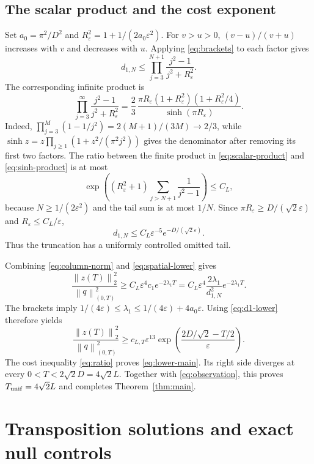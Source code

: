 \documentclass[11pt]{article}
\numberwithin{equation}{section}
\newcommand{\eps}{\varepsilon}
\newcommand{\norm}[1]{\left\|#1\right\|}
\begin{document}
\subsection{The scalar product and the cost exponent}

Set $a_0=\pi^2/D^2$ and $R_\eps^2=1+1/(2a_0\eps^2)$.
For $v>u>0$, $(v-u)/(v+u)$ increases with $v$ and decreases with $u$.
Applying \eqref{eq:brackets} to each factor gives
\begin{equation}\label{eq:scalar-product}
 d_{1,N}\le\prod_{j=3}^{N+1}\frac{j^2-1}{j^2+R_\eps^2}.
\end{equation}
The corresponding infinite product is
\begin{equation}\label{eq:sinh-product}
 \prod_{j=3}^\infty\frac{j^2-1}{j^2+R_\eps^2}
 =\frac23\,\frac{\pi R_\eps(1+R_\eps^2)(1+R_\eps^2/4)}
                              {\sinh(\pi R_\eps)}.
\end{equation}
Indeed, $\prod_{j=3}^M(1-1/j^2)=2(M+1)/(3M)\to2/3$,
while $\sinh z=z\prod_{j\ge1}(1+z^2/(\pi^2j^2))$
\cite[Equation 4.36.1]{DLMF} gives the denominator after removing
its first two factors.
The ratio between the finite product in \eqref{eq:scalar-product}
and \eqref{eq:sinh-product} is at most
\[
 \exp\!\left((R_\eps^2+1)
             \sum_{j>N+1}\frac1{j^2-1}\right)\le C_L,
\]
because $N\ge1/(2\eps^2)$ and the tail sum is at most $1/N$.
Since $\pi R_\eps\ge D/(\sqrt2\eps)$ and $R_\eps\le C_L/\eps$,
\begin{equation}\label{eq:d1-lower}
 d_{1,N}\le C_L\eps^{-5}e^{-D/(\sqrt2\eps)}.
\end{equation}
Thus the truncation has a uniformly controlled omitted tail.

Combining \eqref{eq:column-norm} and \eqref{eq:spatial-lower} gives
\[
 \frac{\norm{z(T)}_2^2}{\norm q_{(0,T)}^2}
 \ge C_L\eps^4c_1e^{-2\lambda_1T}
 =C_L\eps^4\frac{2\lambda_1}{d_{1,N}^2}e^{-2\lambda_1T}.
\]
The brackets imply
$1/(4\eps)\le\lambda_1\le1/(4\eps)+4a_0\eps$.
Using \eqref{eq:d1-lower} therefore yields
\begin{equation}\label{eq:lower-ratio}
 \frac{\norm{z(T)}_2^2}{\norm q_{(0,T)}^2}
 \ge c_{L,T}\eps^{13}
    \exp\!\left(\frac{2D/\sqrt2-T/2}{\eps}\right).
\end{equation}
The cost inequality \eqref{eq:ratio} proves \eqref{eq:lower-main}.
Its right side diverges at every $0<T<2\sqrt2D=4\sqrt2L$.
Together with \eqref{eq:observation}, this proves
$T_{\rm unif}=4\sqrt2L$ and completes Theorem~\ref{thm:main}.

\appendix
\section{Transposition solutions and exact null controls}\label{sec:duality}
\end{document}
